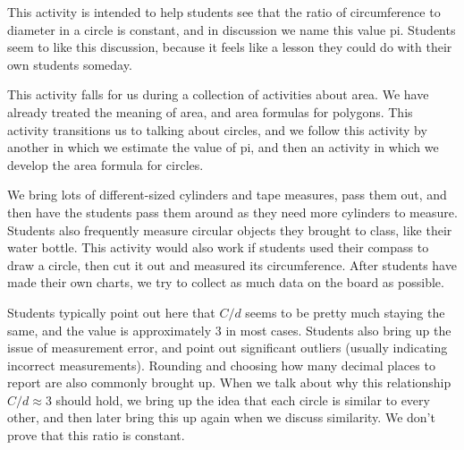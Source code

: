\documentclass{ximera}
\begin{document}
\newpage
\begin{instructorNotes}
This activity is intended to help students see that the ratio of circumference to diameter in a circle is constant, and in discussion we name this value pi.  Students seem to like this discussion, because it feels like a lesson they could do with their own students someday.

This activity falls for us during a collection of activities about area.  We have already treated the meaning of area, and area formulas for polygons.  This activity transitions us to talking about circles, and we follow this activity by another in which we estimate the value of pi, and then an activity in which we develop the area formula for circles.

We bring lots of different-sized cylinders and tape measures, pass them out, and then have the students pass them around as they need more cylinders to measure.  Students also frequently measure circular objects they brought to class, like their water bottle.  This activity would also work if students used their compass to draw a circle, then cut it out and measured its circumference.  After students have made their own charts, we try to collect as much data on the board as possible.

Students typically point out here that $C/d$ seems to be pretty much staying the same, and the value is approximately 3 in most cases.  Students also bring up the issue of measurement error, and point out significant outliers (usually indicating incorrect measurements).  Rounding and choosing how many decimal places to report are also commonly brought up.  When we talk about why this relationship $C/d \approx 3$ should hold, we bring up the idea that each circle is similar to every other, and then later bring this up again when we discuss similarity.  We don't prove that this ratio is constant.




\end{instructorNotes}
\end{document}
